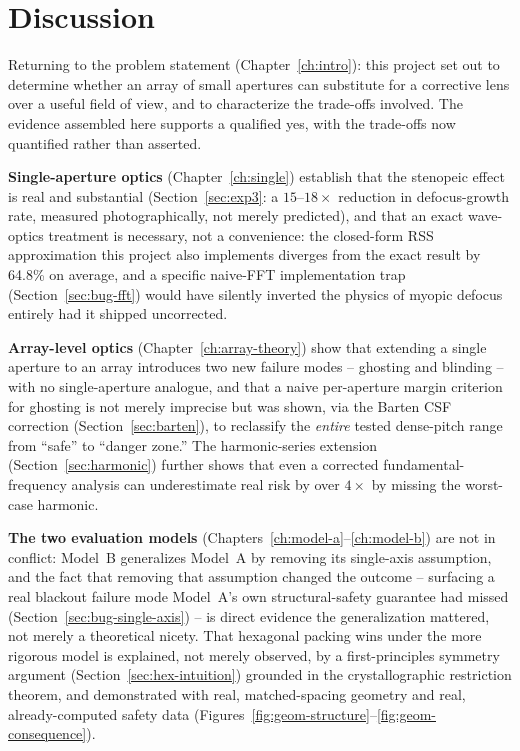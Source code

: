 \chapter{Discussion}
\label{ch:discussion}

Returning to the problem statement (Chapter~\ref{ch:intro}): this project set out to
determine whether an array of small apertures can substitute for a corrective lens over
a useful field of view, and to characterize the trade-offs involved. The evidence
assembled here supports a qualified yes, with the trade-offs now quantified rather than
asserted.

\textbf{Single-aperture optics} (Chapter~\ref{ch:single}) establish that the stenopeic
effect is real and substantial (Section~\ref{sec:exp3}: a $15$--$18\times$ reduction in
defocus-growth rate, measured photographically, not merely predicted), and that an
exact wave-optics treatment is necessary, not a convenience: the closed-form RSS
approximation this project also implements diverges from the exact result by 64.8\% on
average, and a specific naive-FFT implementation trap (Section~\ref{sec:bug-fft}) would
have silently inverted the physics of myopic defocus entirely had it shipped
uncorrected.

\textbf{Array-level optics} (Chapter~\ref{ch:array-theory}) show that extending a single
aperture to an array introduces two new failure modes -- ghosting and blinding -- with
no single-aperture analogue, and that a naive per-aperture margin criterion for
ghosting is not merely imprecise but was shown, via the Barten CSF correction
(Section~\ref{sec:barten}), to reclassify the \emph{entire} tested dense-pitch range
from ``safe'' to ``danger zone.'' The harmonic-series extension
(Section~\ref{sec:harmonic}) further shows that even a corrected fundamental-frequency
analysis can underestimate real risk by over $4\times$ by missing the worst-case
harmonic.

\textbf{The two evaluation models} (Chapters~\ref{ch:model-a}--\ref{ch:model-b}) are not
in conflict: Model~B generalizes Model~A by removing its single-axis assumption, and
the fact that removing that assumption changed the outcome -- surfacing a real
blackout failure mode Model~A's own structural-safety guarantee had missed
(Section~\ref{sec:bug-single-axis}) -- is direct evidence the generalization mattered,
not merely a theoretical nicety. That hexagonal packing wins under the more rigorous
model is explained, not merely observed, by a first-principles symmetry argument
(Section~\ref{sec:hex-intuition}) grounded in the crystallographic restriction theorem,
and demonstrated with real, matched-spacing geometry and real, already-computed safety
data (Figures~\ref{fig:geom-structure}--\ref{fig:geom-consequence}).

